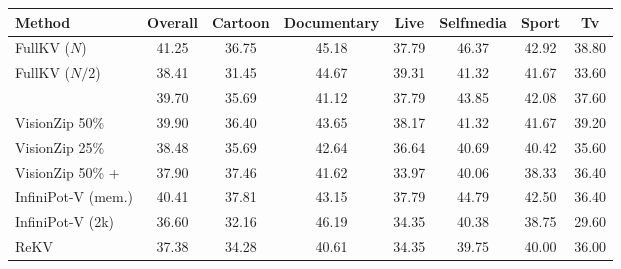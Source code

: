 \begin{tabular}{l|ccccccc}
\toprule
\textbf{Method} & Overall & Cartoon & Documentary & Live & Selfmedia & Sport & Tv \\
\midrule
FullKV ($N$) & 41.25 & 36.75 & 45.18 & 37.79 & 46.37 & 42.92 & 38.80 \\
FullKV ($N/2$) & 38.41 & 31.45 & 44.67 & 39.31 & 41.32 & 41.67 & 33.60 \\
\midrule
\method{} & 39.70 & 35.69 & 41.12 & 37.79 & 43.85 & 42.08 & 37.60 \\
VisionZip 50\% & 39.90 & 36.40 & 43.65 & 38.17 & 41.32 & 41.67 & 39.20 \\
VisionZip 25\% & 38.48 & 35.69 & 42.64 & 36.64 & 40.69 & 40.42 & 35.60 \\
VisionZip 50\% + \method{} & 37.90 & 37.46 & 41.62 & 33.97 & 40.06 & 38.33 & 36.40 \\
InfiniPot-V (mem.) & 40.41 & 37.81 & 43.15 & 37.79 & 44.79 & 42.50 & 36.40 \\
InfiniPot-V (2k) & 36.60 & 32.16 & 46.19 & 34.35 & 40.38 & 38.75 & 29.60 \\
ReKV & 37.38 & 34.28 & 40.61 & 34.35 & 39.75 & 40.00 & 36.00 \\
\bottomrule
\end{tabular}
